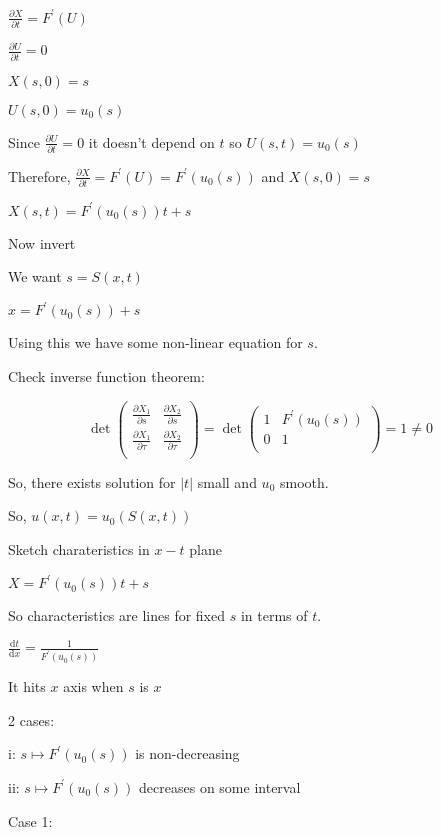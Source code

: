 \documentclass{article}
\theoremstyle{definition}
\begin{document}
\(\frac{\partial X}{\partial t} = F^{\prime} (U)\) 

\(\frac{\partial U}{\partial t} = 0\) 

\(X(s,0)=s\)

\(U(s,0)=u_0(s)\) 

Since \(\frac{\partial U}{\partial t} = 0\) it doesn't depend on \(t\) so \(U(s,t)=u_0(s)\) 

Therefore, \(\frac{\partial X}{\partial t} = F^{\prime} (U)=F^{\prime} (u_0(s))\) and \(X(s,0)=s\)

\(X(s,t)= F^{\prime} (u_0(s))t + s\) 

Now invert

We want \(s = S(x,t)\) 

\(x = F^{\prime} (u_0(s))+s\)

Using this we have some non-linear equation for \(s\).

Check inverse function theorem:

\[
    \det \begin{pmatrix}
        \frac{\partial X_1}{\partial s} & \frac{\partial X_2}{\partial s} \\
        \frac{\partial X_1}{\partial \tau} & \frac{\partial X_2}{\partial \tau}  \\
    \end{pmatrix} = \det \begin{pmatrix}
        1 & F^{\prime} (u_0(s)) \\
        0 &  1 \\
    \end{pmatrix} = 1 \neq 0
\]

So, there exists solution for \(\vert t \vert\) small and \(u_0\) smooth.

So, \(u(x,t)=u_0(S(x,t))\) 

Sketch charateristics in \(x-t\) plane

\(X = F^{\prime}(u_0(s))t + s\)

So characteristics are lines for fixed \(s\) in terms of \(t\).

\(\frac{\mathrm{d}t}{\mathrm{d}x} = \frac{1}{F^{\prime} (u_0(s))}\)

It hits \(x\) axis when \(s\) is \(x\)

2 cases:

i: \(s \mapsto F^{\prime} (u_0(s))\) is non-decreasing

ii: \(s\mapsto F^{\prime} (u_0(s))\) decreases on some interval 

Case 1:
\end{document}
